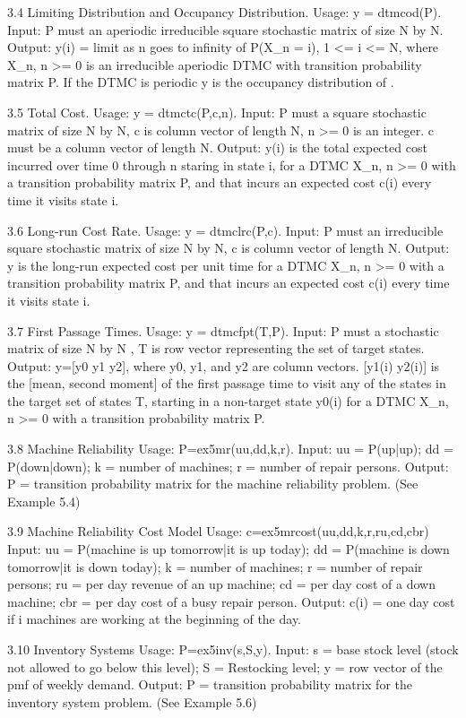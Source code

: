 3.4 Limiting Distribution and Occupancy Distribution.
Usage:  y = dtmcod(P).
Input: P must an aperiodic irreducible square stochastic matrix of size N by N. 
Output:  y(i) = limit as n goes to infinity of P(X_n = i),  1 <= i <= N, where X_n, n >= 0 is an irreducible aperiodic DTMC with transition probability matrix P. If the DTMC is periodic y is the occupancy distribution of \X.

3.5 Total Cost.
Usage:  y = dtmctc(P,c,n).
Input: P must a square stochastic matrix of size N by N, c is column vector of length N, n >= 0 is an integer. c must be a column vector of length N. 
Output:  y(i) is the total expected cost incurred over time 0 through n staring in state i, for a DTMC X_n, n >= 0 with a transition probability matrix P, and that incurs an expected cost c(i) every time it visits state i.
 
3.6 Long-run Cost Rate.
Usage:  y = dtmclrc(P,c).
Input: P must an irreducible square stochastic matrix of size N by N, c is column vector of length N. 
Output:  y is the long-run expected cost per unit time for a DTMC X_n, n >= 0 with a transition probability matrix P, and that incurs an expected cost c(i) every time it visits state i.
 
3.7 First Passage Times.
Usage:  y = dtmcfpt(T,P).
Input: P must a stochastic matrix of size N by N , T is row vector representing the set of target states. 
Output:  y=[y0 y1 y2], where y0, y1, and y2 are column vectors.  [y1(i) y2(i)] is the [mean,  second moment] of the first passage time to visit any of the states in the target set of states T, starting in a non-target state y0(i) for a DTMC X_n, n >= 0 with a transition probability matrix P.

3.8 Machine Reliability
Usage:  P=ex5mr(uu,dd,k,r).
Input: uu = P(up|up); 
dd = P(down|down);
k = number of machines;
r = number of repair persons.
Output: P = transition  probability matrix for the machine reliability problem. (See Example 5.4)
  
3.9 Machine Reliability Cost Model
Usage:  c=ex5mrcost(uu,dd,k,r,ru,cd,cbr)
Input: uu = P(machine is up tomorrow|it is up today); 
dd = P(machine is down tomorrow|it is down today);
k = number of machines;
r = number of repair persons;
ru = per day revenue of an up machine;
cd = per day cost of a down machine;
cbr =  per day cost of a busy repair person. 
Output: c(i) = one day cost if i machines are working at the beginning of the day.

3.10 Inventory Systems
Usage:  P=ex5inv(s,S,y).
Input: s = base stock level (stock not allowed to go below this level); 
S = Restocking level;
y = row vector of the pmf of weekly demand.
Output: P = transition  probability matrix for the inventory system problem. (See Example 5.6)
  
